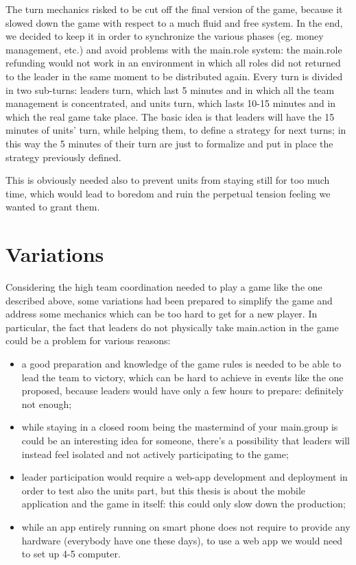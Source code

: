 			The turn mechanics risked to be cut off the final version of the game, because it slowed down the game with respect to a much fluid and free system.
			In the end, we decided to keep it in order to synchronize the various phases (eg. money management, etc.) and avoid problems with the main.role system: the main.role refunding would not work in an environment in which all roles did not returned to the leader in the same moment to be distributed again.
			Every turn is divided in two sub-turns: leaders turn, which last 5 minutes and in which all the team management is concentrated, and units turn, which lasts 10-15 minutes and in which the real game take place.
			The basic idea is that leaders will have the 15 minutes of units' turn, while helping them, to define a strategy for next turns; in this way the 5 minutes of their turn are just to formalize and put in place the strategy previously defined.
			
			This is obviously needed also to prevent units from staying still for too much time, which would lead to boredom and ruin the perpetual tension feeling we wanted to grant them.
			
	\section{Variations}
		
		Considering the high team coordination needed to play a game like the one described above, some variations had been prepared to simplify the game and address some mechanics which can be too hard to get for a new player.
		In particular, the fact that leaders do not physically take main.action in the game could be a problem for various reasons:
		
		\begin{itemize}
			\item a good preparation and knowledge of the game rules is needed to be able to lead the team to victory, which can be hard to achieve in events like the one proposed, because leaders would have only a few hours to prepare: definitely not enough;
			\item while staying in a closed room being the mastermind of your main.group is could be an interesting idea for someone, there's a possibility that leaders will instead feel isolated and not actively participating to the game;
			\item leader participation would require a web-app development and deployment in order to test also the units part, but this thesis is about the mobile application and the game in itself: this could only slow down the production;
			\item while an app entirely running on smart phone does not require to provide any hardware (everybody have one these days), to use a web app we would need to set up 4-5 computer.
		\end{itemize}
		

